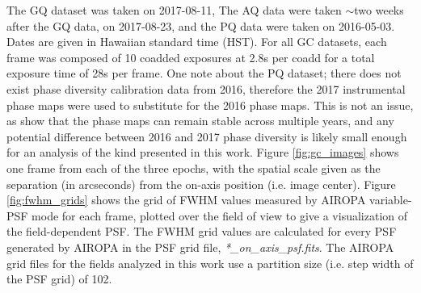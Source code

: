 \documentclass[]{spie}  %
\begin{document}
The GQ dataset was taken on 2017-08-11, The AQ data were taken $\sim$two weeks after the GQ data, on 2017-08-23, and the PQ data were taken on 2016-05-03. Dates are given in Hawaiian standard time (HST). For all GC datasets, each frame was composed of 10 coadded exposures at 2.8s per coadd for a total exposure time of 28s per frame. One note about the PQ dataset; there does not exist phase diversity calibration data from 2016, therefore the 2017 instrumental phase maps were used to substitute for the 2016 phase maps. This is not an issue, as \cite{Ciurlo:inprep} show that the phase maps can remain stable across multiple years, and any potential difference between 2016 and 2017 phase diversity is likely small enough for an analysis of the kind presented in this work. Figure \ref{fig:gc_images} shows one frame from each of the three epochs, with the spatial scale given as the separation (in arcseconds) from the on-axis position (i.e. image center). Figure \ref{fig:fwhm_grids} shows the grid of FWHM values measured by AIROPA variable-PSF mode for each frame, plotted over the field of view to give a visualization of the field-dependent PSF. The FWHM grid values are calculated for every PSF generated by AIROPA in the PSF grid file, \textit{*\_on\_axis\_psf.fits}. The AIROPA grid files for the fields analyzed in this work use a partition size (i.e. step width of the PSF grid) of 102. 



 
\end{document}

